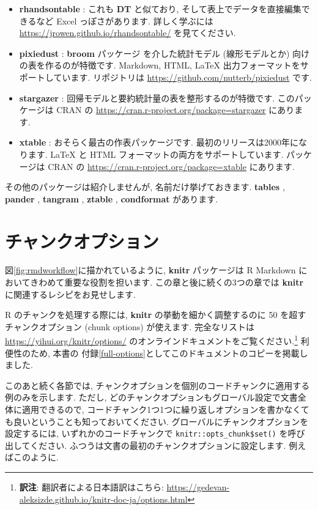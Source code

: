 \documentclass[
  11pt,
  lualatex,
  ja=standard]{bxjsreport}
\begin{document}
\begin{itemize}
\item
  \textbf{rhandsontable} \autocite{R-rhandsontable}: これも \textbf{DT} と似ており, そして表上でデータを直接編集できるなど Excel っぽさがあります. 詳しく学ぶには \url{https://jrowen.github.io/rhandsontable/} を見てください.
\item
  \textbf{pixiedust} \autocite{R-pixiedust}: \textbf{broom} パッケージ \autocite{R-broom} を介した統計モデル (線形モデルとか) 向けの表を作るのが特徴です. Markdown, HTML, LaTeX 出力フォーマットをサポートしています. リポジトリは \url{https://github.com/nutterb/pixiedust} です.
\item
  \textbf{stargazer} \autocite{R-stargazer}: 回帰モデルと要約統計量の表を整形するのが特徴です. このパッケージは CRAN の \url{https://cran.r-project.org/package=stargazer} にあります.
\item
  \textbf{xtable} \autocite{R-xtable}: おそらく最古の作表パッケージです. 最初のリリースは2000年になります. LaTeX と HTML フォーマットの両方をサポートしています. パッケージは CRAN の \url{https://cran.r-project.org/package=xtable} にあります.
\end{itemize}

その他のパッケージは紹介しませんが, 名前だけ挙げておきます. \textbf{tables} \autocite{R-tables}, \textbf{pander} \autocite{R-pander}, \textbf{tangram} \autocite{R-tangram}, \textbf{ztable} \autocite{R-ztable}, \textbf{condformat} \autocite{R-condformat} があります.

\hypertarget{chunk-options}{%
\chapter{チャンクオプション}\label{chunk-options}}

図\ref{fig:rmdworkflow}に描かれているように, \textbf{knitr} パッケージは R Markdown においてきわめて重要な役割を担います. この章と後に続くの3つの章では \textbf{knitr} に関連するレシピをお見せします.

R のチャンクを処理する際には, \textbf{knitr} の挙動を細かく調整するのに 50 を超すチャンクオプション (chunk options) が使えます. 完全なリストは \url{https://yihui.org/knitr/options/} のオンラインドキュメントをご覧ください.\footnote{\textbf{訳注}: 翻訳者による日本語訳はこちら: \url{https://gedevan-aleksizde.github.io/knitr-doc-ja/options.html}} 利便性のため, 本書の 付録\ref{full-options}としてこのドキュメントのコピーを掲載しました.

このあと続く各節では, チャンクオプションを個別のコードチャンクに適用する例のみを示します. ただし, どのチャンクオプションもグローバル設定で文書全体に適用できるので, コードチャンク1つ1つに繰り返しオプションを書かなくても良いということも知っておいてください. グローバルにチャンクオプションを設定するには, いずれかのコードチャンクで \texttt{knitr::opts\_chunk\$set()} を呼び出してください. ふつうは文書の最初のチャンクオプションに設定します. 例えばこのように.
\end{document}
